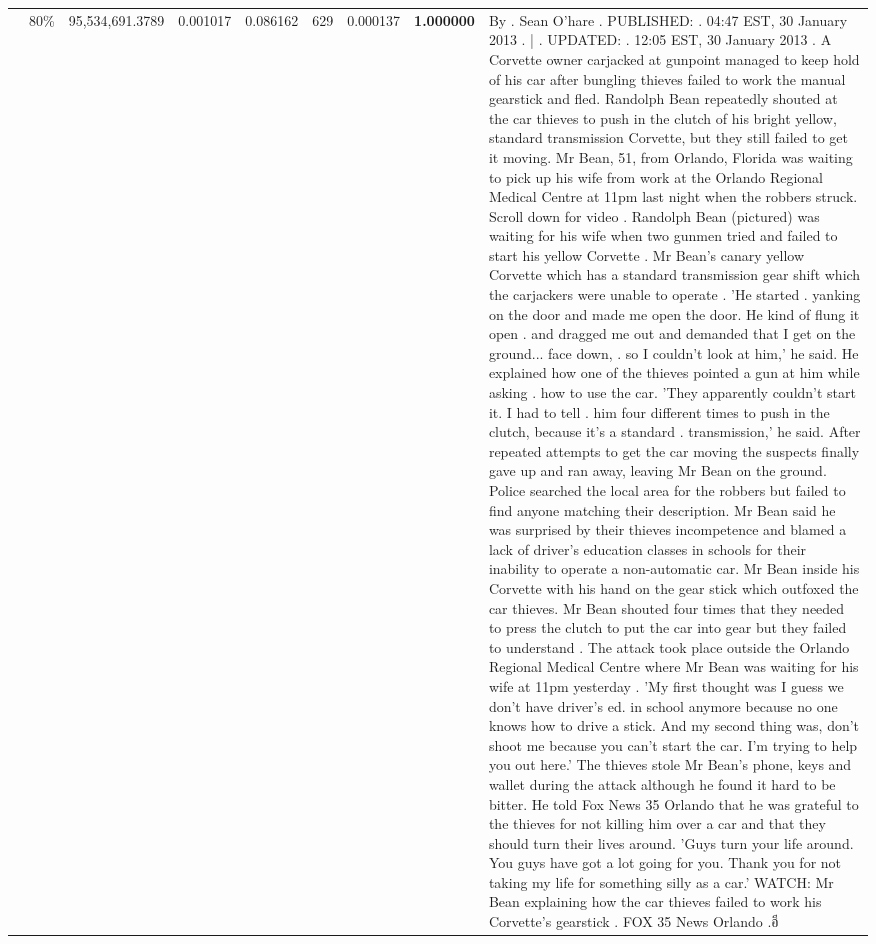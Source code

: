 \begin{table}[H]
\begin{tabular}{llrrrrrrl}
 & 80\% & 95,534,691.3789 & 0.001017 & 0.086162 & \color{red} 629 & 0.000137 & \bfseries \color{red} 1.000000 & By . Sean O'hare . PUBLISHED: . 04:47 EST, 30 January 2013 . | . UPDATED: . 12:05 EST, 30 January 2013 . A Corvette owner carjacked at gunpoint managed to keep hold of his car after bungling thieves failed to work the manual gearstick and fled. Randolph Bean repeatedly shouted at the car thieves to push in the clutch of his bright yellow, standard transmission Corvette, but they still failed to get it moving. Mr Bean, 51, from Orlando, Florida was waiting to pick up his wife from work at the Orlando Regional Medical Centre at 11pm last night when the robbers struck. Scroll down for video . Randolph Bean (pictured) was waiting for his wife when two gunmen tried and failed to start his yellow Corvette . Mr Bean's canary yellow Corvette which has a standard transmission gear shift which the carjackers were unable to operate . 'He started . yanking on the door and made me open the door. He kind of flung it open . and dragged me out and demanded that I get on the ground... face down, . so I couldn't look at him,' he said. He explained how one of the thieves pointed a gun at him while asking . how to use the car. 'They apparently couldn't start it. I had to tell . him four different times to push in the clutch, because it's a standard . transmission,' he said. After repeated attempts to get the car moving the suspects finally gave up and ran away, leaving Mr Bean on the ground. Police searched the local area for the robbers but failed to find anyone matching their description. Mr Bean said he was surprised by their thieves incompetence and blamed a lack of driver's education classes in schools for their inability to operate a non-automatic car. Mr Bean inside his Corvette with his hand on the gear stick which outfoxed the car thieves. Mr Bean shouted four times that they needed to press the clutch to put the car into gear but they failed to understand . The attack took place outside the Orlando Regional Medical Centre where Mr Bean was waiting for his wife at 11pm yesterday . 'My first thought was I guess we don't have driver's ed. in school anymore because no one knows how to drive a stick. And my second thing was, don't shoot me because you can't start the car. I'm trying to help you out here.' The thieves stole Mr Bean's phone, keys and wallet during the attack although he found it hard to be bitter. He told Fox News 35 Orlando that he was grateful to the thieves for not killing him over a car and that they should turn their lives around. 'Guys turn your life around. You guys have got a lot going for you. Thank you for not taking my life for something silly as a car.' WATCH: Mr Bean explaining how the car thieves failed to work his Corvette's gearstick . FOX 35 News Orlando .อี \\

\end{tabular}
\end{table}
